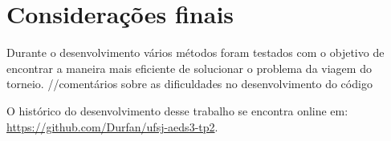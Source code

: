 \documentclass[12pt,a4paper]{article}
\begin{document}
\section{Considerações finais}

Durante o desenvolvimento vários métodos foram testados com o objetivo de encontrar a maneira mais eficiente de solucionar o problema da viagem do torneio.
//comentários sobre as dificuldades no desenvolvimento do código

\pagebreak

\begin{flushleft}
	\nocite{*}
	
	\vfill
	O histórico do desenvolvimento desse trabalho se encontra online em:\\ \url{https://github.com/Durfan/ufsj-aeds3-tp2}.
\end{flushleft}
\end{document}
